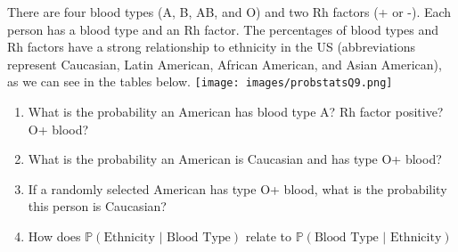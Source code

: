 \documentclass{jhwhw}
\begin{document}
    \problem{}
        There are four blood types (A, B, AB, and O) and two Rh factors (+ or -). Each person
has a blood type and an Rh factor. The percentages of blood types and Rh factors have a
strong relationship to ethnicity in the US (abbreviations represent Caucasian, Latin American,
African American, and Asian American), as we can see in the tables below.
        \texttt{[image: images/probstatsQ9.png]}
        \begin{enumerate}
            \item What is the probability an American has blood type A? Rh factor positive? O+ blood?
            \item What is the probability an American is Caucasian and has type O+ blood?
            \item If a randomly selected American has type O+ blood, what is the probability this person is Caucasian?
            \item How does $\mathbb{P}(\text{Ethnicity } | \text{ Blood Type})$ relate to $\mathbb{P}(\text{Blood Type } | \text{ Ethnicity})$ 

        \end{enumerate}
\end{document}

